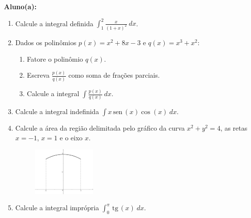 \documentclass[a4paper,5pt]{amsbook}
\newcommand{\sen}{\,\mbox{sen}\,}
\newcommand{\ds}{\displaystyle}
\begin{document}
\vspace{0.5cm}
{\bf Aluno(a):}\dotfill{}  %

\vspace{0.2cm}
\begin{enumerate}
	\vspace{0.5cm}

	\item Calcule a integral definida $\ds\int_1^2 \frac{x}{{(1+x)}^2}\ dx$.
	\vspace{0.5cm}

	\item Dados os polin\^omios $p(x) = x^2 + 8x - 3$ e $q(x) = x^3 + x^2$:
		\begin{enumerate}
				\vspace{0.2cm}
			\item Fatore o polin\^omio $q(x)$.
				\vspace{0.1cm}
			\item Escreva $\ds\frac{p(x)}{q(x)}$ como soma de fra\c{c}\~oes parciais.
			\item Calcule a integral $\ds\int \frac{p(x)}{q(x)}\ dx$.
		\end{enumerate}
	\vspace{0.5cm}

	\item Calcule a integral indefinida $\ds\int x \sen{(x)} \cos{(x)}\ dx$.
	\vspace{0.5cm}

	\item Calcule a \'area da regi\~ao delimitada pelo gr\'afico da curva $x^2 + y^2
		= 4$, as retas $x = -1$, $x = 1$ e o eixo $x$.
		\begin{figure}[h]
			\centering
			\includegraphics[width=0.3\textwidth]{grafico.pdf}
		\end{figure}

	\vspace{0.5cm}

	\item Calcule a integral impr\'opria $\ds\int_0^{\pi}\,\text{tg}\,(x)\ dx$.
	\vspace{0.5cm}
	\vspace{0.5cm}

\end{enumerate}
\end{document}
